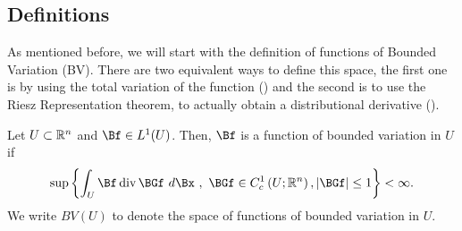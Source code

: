 \begin{comment}
    These are other results I studied a bit but I don't think that are necessary to this exposure, What do you think?\begin{enumerate}
        \item Space of Bounded Measures
        \item  Total variation measure
        \item Absolute continuity measure
        \item Lebesgue Decomposition Theorem
        \item Riesz Representation Theorem
        \item convergence/ Lower semicontinuity
        \item Haussdorff measures
        \item Lebesgue points for Randon measure
        \item Approximate Limits
        \item Measurability and approximate continuity
        \item Trace Theorems
        \item Sobolev embedding
        \item Approximate Differentiability
        \item Regularity
        \item GBD (probably important)
    \end{enumerate}
\end{comment}

\subsection{Definitions}

As mentioned before, we will start with the definition of functions of Bounded Variation (BV). There are two equivalent ways to define this space, the first one is by using the total variation of the function (\cite[Definition 5.1]{evansGa}) and the second is to use the Riesz Representation theorem, to actually obtain a distributional derivative (\cite[Theorem 5.1]{evansGa}). 
\begin{definition} Let $U\subset\mathbb{R}^n$ and $\Bf \in L^1(U)$. Then, $\Bf$ is a function of bounded variation in $U$ if
    $$
    \sup \left\{\int_U \Bf \operatorname{div} \BGf\  d \Bx\ ,\ \BGf \in C_c^1\left(U ; \mathbb{R}^n\right),| \BGf | \leq 1\right\}<\infty .
    $$
    We write
    $B V(U)$
    to denote the space of functions of bounded variation in $U$. 
\end{definition}

